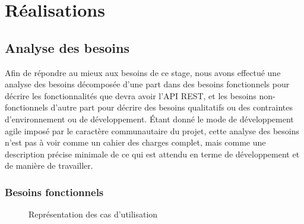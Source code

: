 \documentclass[a4paper, 11pt]{report}
\begin{document}
\chapter{Réalisations}

\section{Analyse des besoins}

Afin de répondre au mieux aux besoins de ce stage, nous avons effectué
une analyse des besoins décomposée d'une part dans des besoins
fonctionnels pour décrire les fonctionnalités que devra avoir l'API
REST, et les besoins non-fonctionnels d'autre part pour décrire des
besoins qualitatifs ou des contraintes d'environnement ou de
développement. Étant donné le mode de développement agile imposé par
le caractère communautaire du projet, cette analyse des besoins n'est
pas à voir comme un cahier des charges complet, mais comme une
description précise minimale de ce qui est attendu en terme de
développement et de manière de travailler.

\subsection{Besoins fonctionnels}

\begin{figure}
  \centering
  \caption{Représentation des cas d'utilisation}
  \label{fig:needs}
\end{figure}
\end{document}
